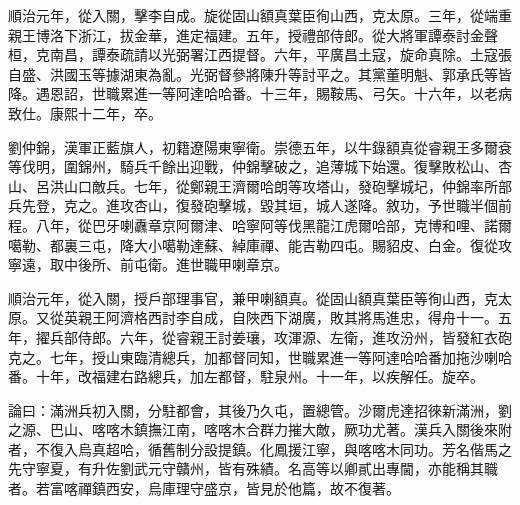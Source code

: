 \begin{pinyinscope}
順治元年，從入關，擊李自成。旋從固山額真葉臣徇山西，克太原。三年，從端重親王博洛下浙江，拔金華，進定福建。五年，授禮部侍郎。從大將軍譚泰討金聲桓，克南昌，譚泰疏請以光弼署江西提督。六年，平廣昌土寇，旋命真除。土寇張自盛、洪國玉等據湖東為亂。光弼督參將陳升等討平之。其黨董明魁、郭承氏等皆降。遇恩詔，世職累進一等阿達哈哈番。十三年，賜鞍馬、弓矢。十六年，以老病致仕。康熙十二年，卒。

劉仲錦，漢軍正藍旗人，初籍遼陽東寧衛。崇德五年，以牛錄額真從睿親王多爾袞等伐明，圍錦州，騎兵千餘出迎戰，仲錦擊破之，追薄城下始還。復擊敗松山、杏山、呂洪山口敵兵。七年，從鄭親王濟爾哈朗等攻塔山，發砲擊城圮，仲錦率所部兵先登，克之。進攻杏山，復發砲擊城，毀其垣，城人遂降。敘功，予世職半個前程。八年，從巴牙喇纛章京阿爾津、哈寧阿等伐黑龍江虎爾哈部，克博和哩、諾爾噶勒、都裏三屯，降大小噶勒達蘇、綽庫禪、能吉勒四屯。賜貂皮、白金。復從攻寧遠，取中後所、前屯衛。進世職甲喇章京。

順治元年，從入關，授戶部理事官，兼甲喇額真。從固山額真葉臣等徇山西，克太原。又從英親王阿濟格西討李自成，自陜西下湖廣，敗其將馬進忠，得舟十一。五年，擢兵部侍郎。六年，從睿親王討姜瓖，攻渾源、左衛，進攻汾州，皆發紅衣砲克之。七年，授山東臨清總兵，加都督同知，世職累進一等阿達哈哈番加拖沙喇哈番。十年，改福建右路總兵，加左都督，駐泉州。十一年，以疾解任。旋卒。

論曰：滿洲兵初入關，分駐都會，其後乃久屯，置總管。沙爾虎達招徠新滿洲，劉之源、巴山、喀喀木鎮撫江南，喀喀木合群力摧大敵，厥功尤著。漢兵入關後來附者，不復入烏真超哈，循舊制分設提鎮。化鳳援江寧，與喀喀木同功。芳名偕馬之先守寧夏，有升佐劉武元守贛州，皆有殊績。名高等以卿貳出專閫，亦能稱其職者。若富喀禪鎮西安，烏庫理守盛京，皆見於他篇，故不復著。


\end{pinyinscope}
